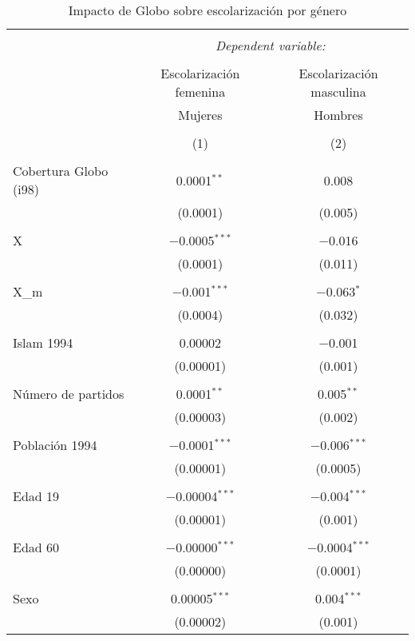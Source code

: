 
\begin{table}[!htbp] \centering 
  \caption{Impacto de Globo sobre escolarización por género} 
  \label{tab:globo_genero} 
\begin{tabular}{@{\extracolsep{5pt}}lcc} 
\\[-1.8ex]\hline 
\hline \\[-1.8ex] 
 & \multicolumn{2}{c}{\textit{Dependent variable:}} \\ 
\cline{2-3} 
\\[-1.8ex] & Escolarización femenina & Escolarización masculina \\ 
 & Mujeres & Hombres \\ 
\\[-1.8ex] & (1) & (2)\\ 
\hline \\[-1.8ex] 
 Cobertura Globo (i98) & 0.0001$^{**}$ & 0.008 \\ 
  & (0.0001) & (0.005) \\ 
  & & \\ 
 X & $-$0.0005$^{***}$ & $-$0.016 \\ 
  & (0.0001) & (0.011) \\ 
  & & \\ 
 X_m & $-$0.001$^{***}$ & $-$0.063$^{*}$ \\ 
  & (0.0004) & (0.032) \\ 
  & & \\ 
 Islam 1994 & 0.00002 & $-$0.001 \\ 
  & (0.00001) & (0.001) \\ 
  & & \\ 
 Número de partidos & 0.0001$^{**}$ & 0.005$^{**}$ \\ 
  & (0.00003) & (0.002) \\ 
  & & \\ 
 Población 1994 & $-$0.0001$^{***}$ & $-$0.006$^{***}$ \\ 
  & (0.00001) & (0.0005) \\ 
  & & \\ 
 Edad 19 & $-$0.00004$^{***}$ & $-$0.004$^{***}$ \\ 
  & (0.00001) & (0.001) \\ 
  & & \\ 
 Edad 60 & $-$0.00000$^{***}$ & $-$0.0004$^{***}$ \\ 
  & (0.00000) & (0.0001) \\ 
  & & \\ 
 Sexo & 0.00005$^{***}$ & 0.004$^{***}$ \\ 
  & (0.00002) & (0.001) \\ 

\end{tabular}
\end{table}
